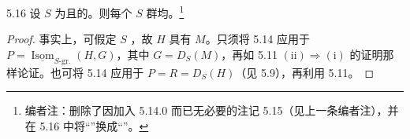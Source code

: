 \begin{SGAresult}{}{5.16}
设 $S$ 为且的。则每个 $S$ 群均。\footnote[46]{编者注：删除了因加入 5.14.0 而已无必要的注记 5.15（见上一条编者注），并在 5.16 中将“”换成“”。}
\end{SGAresult}
\begin{proof}
事实上，可假定 $S$ ，故 $H$ 具有 $M$。只须将 5.14 应用于 $P=\underline{\operatorname{Isom}}_{S\text{-gr.}}(H,G)$，其中 $G=D_S(M)$，再如 5.11 $(\mathrm{ii})\Rightarrow(\mathrm i)$ 的证明那样论证。也可将 5.14 应用于 $P=R=D_S(H)$（见 5.9），再利用 5.11。
\end{proof}
